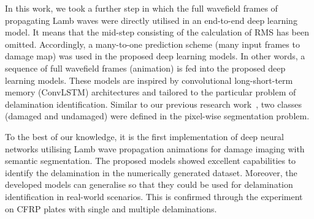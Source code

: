 \begin{sloppypar}
	In this work, we took a further step in which the full wavefield frames of propagating Lamb waves were directly utilised in an end-to-end
	deep learning model.
	It means that the mid-step consisting of the calculation of RMS has been omitted.
	Accordingly, a many-to-one prediction scheme (many input frames to damage map) was used in the proposed deep learning models.
	In other words, a sequence of full wavefield frames (animation) is fed into the proposed deep learning models.
	These models are inspired by convolutional long-short-term memory (ConvLSTM) architectures and tailored to the particular problem of delamination identification.
	Similar to our previous research work~\cite{Ijjeh2021, Ijjeh2022}, two 
	classes (damaged and undamaged) were defined in the pixel-wise segmentation 
	problem.
	
	To the best of our knowledge, it is the first implementation of deep neural networks utilising Lamb wave propagation animations for damage imaging with semantic segmentation. 
	The proposed models showed excellent capabilities to identify the delamination in the numerically generated dataset.
	Moreover, the developed models can generalise so that they could be used for delamination identification in real-world scenarios.
	This is confirmed through the experiment on CFRP plates with single and multiple delaminations.
\end{sloppypar}


